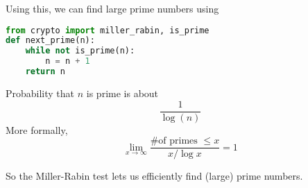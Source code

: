 Using this, we can find large prime numbers using
\begin{lstlisting}[language=Python]
from crypto import miller_rabin, is_prime
def next_prime(n):
    while not is_prime(n):
        n = n + 1
    return n
\end{lstlisting}

\begin{theorem}
    Probability that $n$ is prime is about
    \[\frac{1}{\log(n)}\]
    More formally,
    \[\lim_{x\to \infty}\frac{\text{\# of primes $\leq x$}}{x/\log x} = 1\]
\end{theorem}

So the Miller-Rabin test lets us efficiently find (large) prime numbers.